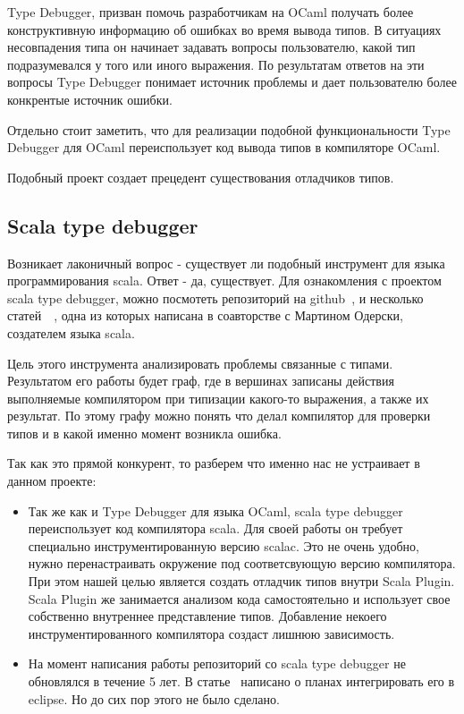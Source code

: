 Type Debugger, призван помочь разработчикам на OCaml получать более
конструктивную информацию об ошибках во время вывода типов.
В ситуациях несовпадения типа он начинает задавать
вопросы пользователю, какой тип подразумевался у того или иного выражения.
По результатам ответов на эти вопросы Type Debugger понимает источник проблемы
и дает пользователю более конкрентые источник ошибки.

Отдельно стоит заметить, что для реализации подобной функциональности
Type Debugger для OCaml переиспользует код вывода типов в компиляторе OCaml.

Подобный проект создает прецедент существования отладчиков типов.

\subsection{Scala type debugger}
\label{sec:typeDebugger}

Возникает лаконичный вопрос - существует ли подобный инструмент для языка
программирования scala.
Ответ - да, существует.
Для ознакомления с проектом scala type debugger, можно посмотеть репозиторий на
github~\cite{type_debugger_github}, и несколько
статей~\cite{type_debugger1}~\cite{type_debugger2}, одна из которых
написана в соавторстве с Мартином Одерски, создателем языка scala.

Цель этого инструмента анализировать проблемы связанные с типами.
Результатом его работы будет граф, где в вершинах записаны действия выполняемые
компилятором при типизации какого-то выражения, а также их результат.
По этому графу можно понять что делал компилятор для проверки типов и
в какой именно момент возникла ошибка.

Так как это прямой конкурент, то разберем что именно нас не устраивает в данном
проекте:
\begin{itemize}
  \item Так же как и Type Debugger для языка OCaml, scala type debugger
  переиспользует код компилятора scala.
  Для своей работы он требует специально инструментированную версию scalac.
  Это не очень удобно, нужно перенастраивать окружение под соответсвующую версию
  компилятора.
  При этом нашей целью является создать отладчик типов внутри Scala Plugin.
  Scala Plugin же занимается анализом кода самостоятельно и использует
  свое собственно внутреннее представление типов.
  Добавление некоего инструментированного компилятора создаст лишнюю зависимость.
  \item На момент написания работы репозиторий со scala type debugger не
  обновлялся в течение 5 лет.
  В статье~\cite{type_debugger1} написано о планах интегрировать его в eclipse.
  Но до сих пор этого не было сделано.
\end{itemize}

